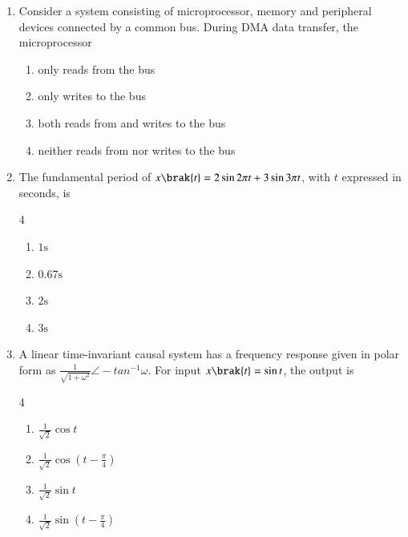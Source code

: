 \documentclass[journal,12pt,onecolumn]{IEEEtran}
\theoremstyle{remark}
\begin{document}
\begin{enumerate}
\vspace{0.5cm}

\item Consider a system consisting of microprocessor, memory and peripheral devices connected by a common bus. During DMA data transfer, the microprocessor\par \hfill{}
    \begin{enumerate}
        \item only reads from the bus
        \item only writes to the bus
        \item both reads from and writes to the bus
        \item neither reads from nor writes to the bus
\end{enumerate}

\vspace{0.5cm}
\item The fundamental period of $x\brak{t}=2\sin{2{\pi}t} + 3\sin3{\pi}t$, with $t$ expressed in seconds, is\par \hfill{}
\begin{multicols}{4}
    \begin{enumerate}
        \item $1\text{s}$
        \item $0.67\text{s}$
        \item $2\text{s}$
        \item $3\text{s}$
\end{enumerate}
\end{multicols}

\vspace{0.5cm}
\item A linear time-invariant causal system has a frequency response given in polar form as $\frac{1}{\sqrt{1+{\omega}^2}}$$\angle-tan^{-1}\omega$. For input $x\brak{t}=\sin{t}$, the output is  \par \hfill{}
\begin{multicols}{4}
    \begin{enumerate}
        \item $\frac{1}{\sqrt{2}}\cos{t}$
        \item $\frac{1}{\sqrt{2}}\cos{(t-\frac{\pi}{4})}$
        \item $\frac{1}{\sqrt{2}}\sin{t}$
        \item $\frac{1}{\sqrt{2}}\sin{(t-\frac{\pi}{4})}$
\end{enumerate}
\end{multicols}


\end{enumerate}
\end{document}
